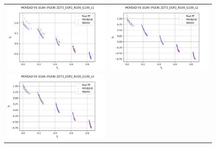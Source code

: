\begin{figure}[H]
    \centering
    \begin{tabular}{c c}
    \includegraphics[scale=0.5]{figures/ZDT3_EOP2_N100_G100_T15/s1_comp.png} &
    \includegraphics[scale=0.5]{figures/ZDT3_EOP2_N100_G100_T15/s2_comp.png}\\
    \includegraphics[scale=0.5]{figures/ZDT3_EOP2_N100_G100_T15/s3_comp.png} &

\end{tabular}
\end{figure}
